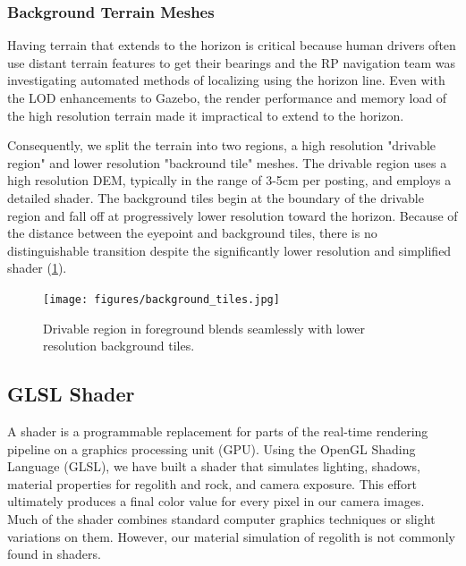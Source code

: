 \documentclass[twocolumn,letterpaper]{IEEEAerospaceCLS}  %
\begin{document}
\subsubsection{Background Terrain Meshes}

Having terrain that extends to the horizon is critical because human drivers often use distant terrain features to get their bearings and the RP navigation team was investigating automated methods of localizing using the horizon line. Even with the LOD enhancements to Gazebo, the render performance and memory load of the high resolution terrain made it impractical to extend to the horizon. 

Consequently, we split the terrain into two regions, a high resolution "drivable region" and lower resolution "backround tile" meshes. 
The drivable region uses a high resolution DEM, typically in the range of 3-5cm per posting, and employs a detailed shader. 
The background tiles begin at the boundary of the drivable region and fall off at progressively lower resolution toward the horizon. 
Because of the distance between the eyepoint and background tiles, there is no distinguishable transition despite the significantly lower resolution and simplified shader (\cref{fig:background_tiles}). 

\begin{figure}[h!]
  \texttt{[image: figures/background\_tiles.jpg]}
  \caption{Drivable region in foreground blends seamlessly with lower resolution background tiles.}
  \label{fig:background_tiles}
\end{figure}

\subsection{GLSL Shader}

A shader is a programmable replacement for parts of the real-time rendering pipeline on a graphics processing unit (GPU). 
Using the OpenGL Shading Language (GLSL), we have built a shader that simulates lighting, shadows, material properties for regolith and rock, and camera exposure. 
This effort ultimately produces a final color value for every pixel in our camera images. 
Much of the shader combines standard computer graphics techniques or slight variations on them. 
However, our material simulation of regolith is not commonly found in shaders.
\end{document}
